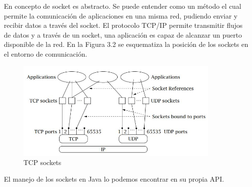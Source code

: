 \documentclass[a4paper,11pt]{book}
\begin{document}
				 En concepto de socket es abstracto. Se puede entender como un método el cual permite la comunicación de aplicaciones en una misma red, pudiendo enviar y recibir datos a través del socket. El protocolo TCP/IP permite transmitir flujos de datos y a través de un socket, una aplicación es capaz de alcanzar un puerto disponible de la red. En la Figura 3.2 se esquematiza la posición de los sockets en el entorno de comunicación.
				 \begin{figure}[hbtp]
				 \centering
				 \includegraphics[width = 10cm]{FIGURAS/Explica_Sockets.JPG}
				 \caption{TCP sockets}
				 \end{figure}	
		El manejo de los sockets en Java lo podemos encontrar en su propia API. 
\end{document}
